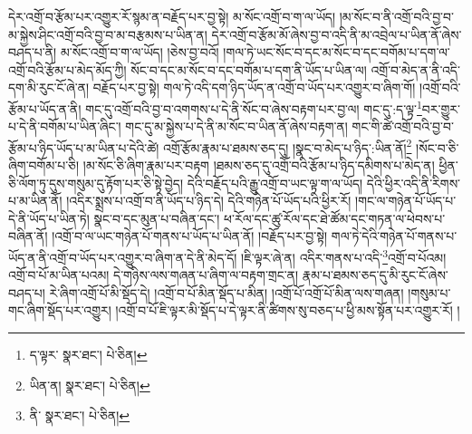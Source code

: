 དེར་འགྲོ་བ་རྩོམ་པར་འགྱུར་རོ་སྙམ་ན་བརྗོད་པར་བྱ་སྟེ། མ་སོང་འགྲོ་བ་ག་ལ་ཡོད། །མ་སོང་བ་ནི་འགྲོ་བའི་བྱ་བ་མ་སྐྱེས་ཤིང་འགྲོ་བའི་བྱ་བ་མ་བརྩམས་པ་ཡིན་ན། དེར་འགྲོ་བ་རྩོམ་མོ་ཞེས་བྱ་བ་འདི་ནི་མ་འབྲེལ་པ་ཡིན་ནོ་ཞེས་བཤད་པ་ནི། མ་སོང་འགྲོ་བ་ག་ལ་ཡོད། །ཅེས་བྱ་བའོ། །གལ་ཏེ་ཡང་སོང་བ་དང་མ་སོང་བ་དང་བགོམ་པ་དག་ལ་འགྲོ་བའི་རྩོམ་པ་མེད་མོད་ཀྱི། སོང་བ་དང་མ་སོང་བ་དང་བགོམ་པ་དག་ནི་ཡོད་པ་ཡིན་ལ། འགྲོ་བ་མེད་ན་ནི་འདི་དག་མི་རུང་ངོ་ཞེ་ན། བརྗོད་པར་བྱ་སྟེ། གལ་ཏེ་འདི་དག་ཉིད་ཡོད་ན་འགྲོ་བ་ཡོད་པར་འགྱུར་བ་ཞིག་གོ། །འགྲོ་བའི་རྩོམ་པ་ཡོད་ན་ནི། གང་དུ་འགྲོ་བའི་བྱ་བ་འགགས་པ་དེ་ནི་སོང་བ་ཞེས་བརྟག་པར་བྱ་ལ། གང་དུ་:ད་ལྟ་\footnote{ད་ལྟར་  སྣར་ཐང་།  པེ་ཅིན། }བར་གྱུར་པ་དེ་ནི་བགོམ་པ་ཡིན་ཞིང་། གང་དུ་མ་སྐྱེས་པ་དེ་ནི་མ་སོང་བ་ཡིན་ནོ་ཞེས་བརྟག་ན། གང་གི་ཚེ་འགྲོ་བའི་བྱ་བ་རྩོམ་པ་ཉིད་ཡོད་པ་མ་ཡིན་པ་དེའི་ཚེ། འགྲོ་རྩོམ་རྣམ་པ་ཐམས་ཅད་དུ། །སྣང་བ་མེད་པ་ཉིད་:ཡིན་ནོ།\footnote{ཡིན་ན།  སྣར་ཐང་།  པེ་ཅིན། } །སོང་བ་ཅི་ཞིག་བགོམ་པ་ཅི། །མ་སོང་ཅི་ཞིག་རྣམ་པར་བརྟག །ཐམས་ཅད་དུ་འགྲོ་བའི་རྩོམ་པ་ཉིད་དམིགས་པ་མེད་ན། ཕྱིན་ཅི་ལོག་ཏུ་དུས་གསུམ་དུ་རྟོག་པར་ཅི་སྟེ་བྱེད། དེའི་བརྗོད་པའི་རྒྱུ་འགྲོ་བ་ཡང་ལྟ་ག་ལ་ཡོད། དེའི་ཕྱིར་འདི་ནི་རིགས་པ་མ་ཡིན་ནོ། །འདིར་སྨྲས་པ་འགྲོ་བ་ནི་ཡོད་པ་ཉིད་དེ། དེའི་གཉེན་པོ་ཡོད་པའི་ཕྱིར་རོ། །གང་ལ་གཉེན་པོ་ཡོད་པ་དེ་ནི་ཡོད་པ་ཡིན་ཏེ། སྣང་བ་དང་མུན་པ་བཞིན་དང་། ཕ་རོལ་དང་ཚུ་རོལ་དང་ཐེ་ཚོམ་དང་གཏན་ལ་ཕེབས་པ་བཞིན་ནོ། །འགྲོ་བ་ལ་ཡང་གཉེན་པོ་གནས་པ་ཡོད་པ་ཡིན་ནོ། །བརྗོད་པར་བྱ་སྟེ། གལ་ཏེ་དེའི་གཉེན་པོ་གནས་པ་ཡོད་ན་ནི་འགྲོ་བ་ཡོད་པར་འགྱུར་བ་ཞིག་ན་དེ་ནི་མེད་དོ། །ཇི་ལྟར་ཞེ་ན། འདིར་གནས་པ་འདི་\footnote{ནི་  སྣར་ཐང་།  པེ་ཅིན། }འགྲོ་བ་པོའམ། འགྲོ་བ་པོ་མ་ཡིན་པའམ། དེ་གཉིས་ལས་གཞན་པ་ཞིག་ལ་བརྟག་གྲང་ན། རྣམ་པ་ཐམས་ཅད་དུ་མི་རུང་ངོ་ཞེས་བཤད་པ། རེ་ཞིག་འགྲོ་པོ་མི་སྡོད་དེ། །འགྲོ་བ་པོ་མིན་སྡོད་པ་མིན། །འགྲོ་པོ་འགྲོ་པོ་མིན་ལས་གཞན། །གསུམ་པ་གང་ཞིག་སྡོད་པར་འགྱུར། །འགྲོ་བ་པོ་ཇི་ལྟར་མི་སྡོད་པ་དེ་ལྟར་ནི་ཚིགས་སུ་བཅད་པ་ཕྱི་མས་སྟོན་པར་འགྱུར་རོ། །
